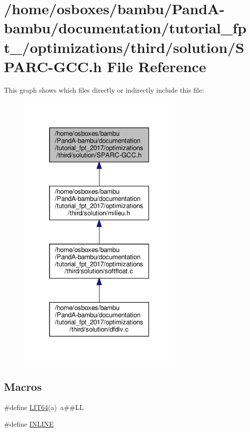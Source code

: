 \hypertarget{tutorial__fpt__2017_2optimizations_2third_2solution_2SPARC-GCC_8h}{}\section{/home/osboxes/bambu/\+Pand\+A-\/bambu/documentation/tutorial\+\_\+fpt\+\_/optimizations/third/solution/\+S\+P\+A\+R\+C-\/\+G\+CC.h File Reference}
\label{tutorial__fpt__2017_2optimizations_2third_2solution_2SPARC-GCC_8h}
This graph shows which files directly or indirectly include this file\+:
\nopagebreak
\begin{figure}[H]
\begin{center}
\leavevmode
\includegraphics[width=232pt]{d9/d59/tutorial__fpt__2017_2optimizations_2third_2solution_2SPARC-GCC_8h__dep__incl}
\end{center}
\end{figure}
\subsection*{Macros}
\begin{DoxyCompactItemize}
\item 
\#define \hyperlink{tutorial__fpt__2017_2optimizations_2third_2solution_2SPARC-GCC_8h_a575f5a619c8e7d71c338c70a2b4e25a5}{L\+I\+T64}(a)~a\#\#LL
\item 
\#define \hyperlink{tutorial__fpt__2017_2optimizations_2third_2solution_2SPARC-GCC_8h_a2eb6f9e0395b47b8d5e3eeae4fe0c116}{I\+N\+L\+I\+NE}
\end{DoxyCompactItemize}
